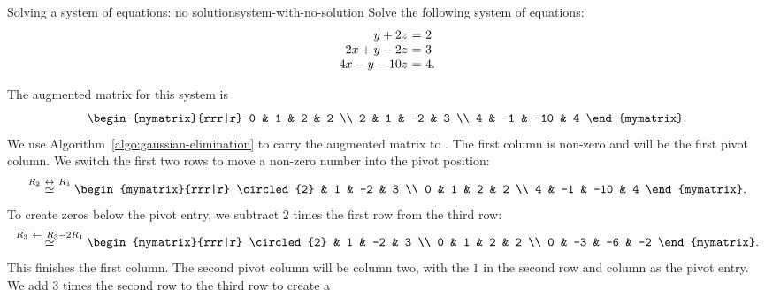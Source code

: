 \begin{example}{Solving a system of equations: no solution}{system-with-no-solution}
  Solve the following system of equations:
  \begin{equation*}
    \begin{array}{r@{~}c@{~}l}
      y + 2z &=& 2 \\
      2x + y - 2z &=& 3 \\
      4x - y - 10z &=& 4.
    \end{array}
  \end{equation*}
\end{example}

\begin{solution} The augmented matrix for this system is
  \begin{equation*}
    \begin{mymatrix}{rrr|r}
      0 &  1 &   2 & 2 \\
      2 &  1 &  -2 & 3 \\
      4 & -1 & -10 & 4
    \end{mymatrix}.
  \end{equation*}
  We use Algorithm~\ref{algo:gaussian-elimination} to carry the
  augmented matrix to {\ef}. The first column is non-zero and will be the
  first pivot column. We switch the first two rows to move a non-zero
  number into the pivot position:
  \begin{equation*}
  \stackrel{R_2\rowswap R_1}{\roweq}
    \begin{mymatrix}{rrr|r}
      \circled{2} &  1 &  -2 & 3 \\
      0 &  1 &   2 & 2 \\
      4 & -1 & -10 & 4
    \end{mymatrix}.
  \end{equation*}
  To create zeros below the pivot entry, we subtract $2$ times the
  first row from the third row:
  \begin{equation*}
  \stackrel{R_3\rowop R_3-2R_1}{\roweq}
    \begin{mymatrix}{rrr|r}
      \circled{2} &  1 &  -2 & 3 \\
      0 &  1 &   2 & 2 \\
      0 & -3 & -6 & -2
    \end{mymatrix}.
  \end{equation*}
  This finishes the first column. The second pivot column will be
  column two, with the $1$ in the second row and column as the pivot
  entry. We add $3$ times the second row to the third row to create a

\end{solution}
